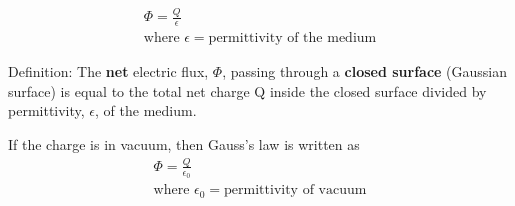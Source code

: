 \documentclass[../../../main.tex]{subfiles}
\begin{document}
\begin{gather*}
    \Phi=\frac{Q}{\epsilon} \\
    \text{where } \epsilon= \text{permittivity of the medium}
\end{gather*}

\begin{mdframed}
    Definition: The \textbf{net} electric flux, \(\Phi\), passing through a \textbf{closed surface} (Gaussian surface) is equal to the total net charge Q inside the closed surface divided by permittivity, \(\epsilon\), of the medium.
\end{mdframed}
If the charge is in vacuum, then Gauss's law is written as
\begin{gather*}
    \Phi=\frac{Q}{\epsilon_0} \\
    \text{where } \epsilon_0= \text{permittivity of vacuum}
\end{gather*}
\end{document}
